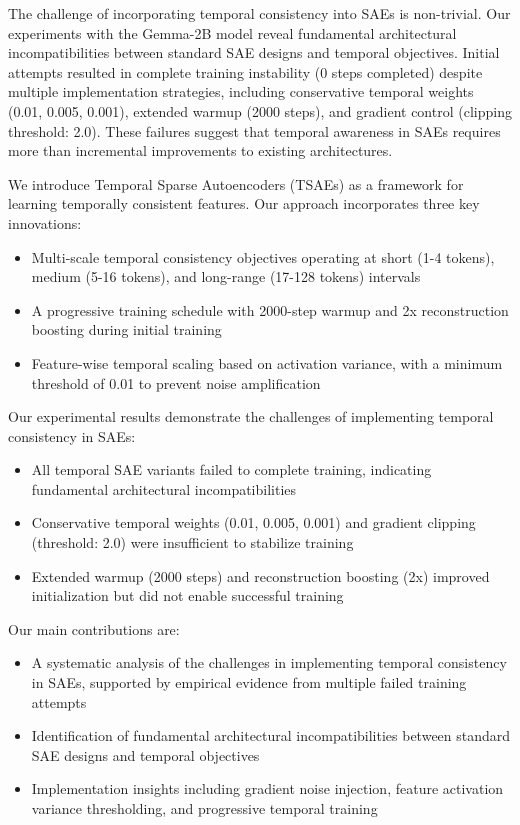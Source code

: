 \documentclass{article} %
\begin{document}
The challenge of incorporating temporal consistency into SAEs is non-trivial. Our experiments with the Gemma-2B model reveal fundamental architectural incompatibilities between standard SAE designs and temporal objectives. Initial attempts resulted in complete training instability (0 steps completed) despite multiple implementation strategies, including conservative temporal weights (0.01, 0.005, 0.001), extended warmup (2000 steps), and gradient control (clipping threshold: 2.0). These failures suggest that temporal awareness in SAEs requires more than incremental improvements to existing architectures.

We introduce Temporal Sparse Autoencoders (TSAEs) as a framework for learning temporally consistent features. Our approach incorporates three key innovations:
\begin{itemize}
    \item Multi-scale temporal consistency objectives operating at short (1-4 tokens), medium (5-16 tokens), and long-range (17-128 tokens) intervals
    \item A progressive training schedule with 2000-step warmup and 2x reconstruction boosting during initial training
    \item Feature-wise temporal scaling based on activation variance, with a minimum threshold of 0.01 to prevent noise amplification
\end{itemize}

Our experimental results demonstrate the challenges of implementing temporal consistency in SAEs:
\begin{itemize}
    \item All temporal SAE variants failed to complete training, indicating fundamental architectural incompatibilities
    \item Conservative temporal weights (0.01, 0.005, 0.001) and gradient clipping (threshold: 2.0) were insufficient to stabilize training
    \item Extended warmup (2000 steps) and reconstruction boosting (2x) improved initialization but did not enable successful training
\end{itemize}

Our main contributions are:
\begin{itemize}
    \item A systematic analysis of the challenges in implementing temporal consistency in SAEs, supported by empirical evidence from multiple failed training attempts
    \item Identification of fundamental architectural incompatibilities between standard SAE designs and temporal objectives
    \item Implementation insights including gradient noise injection, feature activation variance thresholding, and progressive temporal training
\end{itemize}
\end{document}

